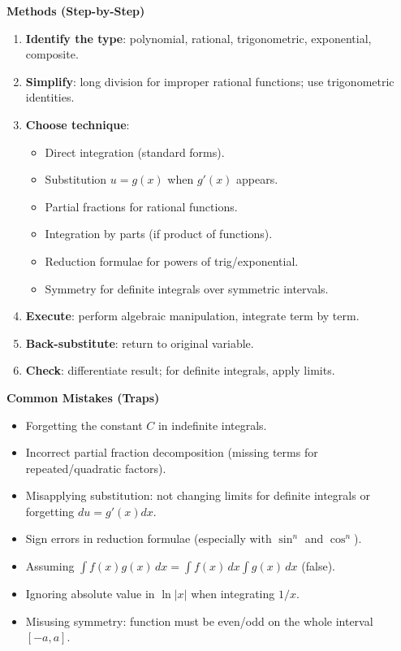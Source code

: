 \documentclass[11pt]{article}
\begin{document}
\begin{bilan}
\textbf{Methods (Step-by-Step)}
\begin{enumerate}
\item \textbf{Identify the type}: polynomial, rational, trigonometric, exponential, composite.
\item \textbf{Simplify}: long division for improper rational functions; use trigonometric identities.
\item \textbf{Choose technique}: 
\begin{itemize}
\item Direct integration (standard forms).
\item Substitution $u=g(x)$ when $g'(x)$ appears.
\item Partial fractions for rational functions.
\item Integration by parts (if product of functions).
\item Reduction formulae for powers of trig/exponential.
\item Symmetry for definite integrals over symmetric intervals.
\end{itemize}
\item \textbf{Execute}: perform algebraic manipulation, integrate term by term.
\item \textbf{Back-substitute}: return to original variable.
\item \textbf{Check}: differentiate result; for definite integrals, apply limits.
\end{enumerate}

\textbf{Common Mistakes (Traps)}
\begin{itemize}
\item Forgetting the constant $C$ in indefinite integrals.
\item Incorrect partial fraction decomposition (missing terms for repeated/quadratic factors).
\item Misapplying substitution: not changing limits for definite integrals or forgetting $du = g'(x)dx$.
\item Sign errors in reduction formulae (especially with $\sin^n$ and $\cos^n$).
\item Assuming $\int f(x)g(x)\,dx = \int f(x)\,dx \int g(x)\,dx$ (false).
\item Ignoring absolute value in $\ln|x|$ when integrating $1/x$.
\item Misusing symmetry: function must be even/odd on the whole interval $[-a,a]$.
\end{itemize}


\end{bilan}
\end{document}
